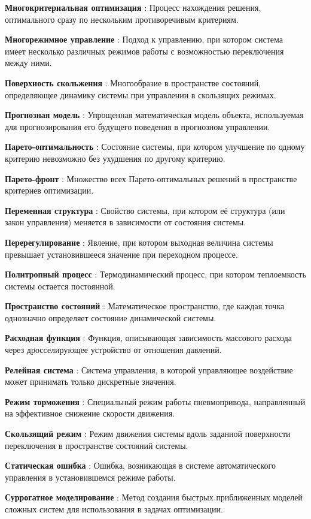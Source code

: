 \textbf{Многокритериальная оптимизация} : Процесс нахождения решения, оптимального сразу по нескольким противоречивым критериям.

\textbf{Многорежимное управление} : Подход к управлению, при котором система имеет несколько различных режимов работы с возможностью переключения между ними.

\textbf{Поверхность скольжения} : Многообразие в пространстве состояний, определяющее динамику системы при управлении в скользящих режимах.

\textbf{Прогнозная модель} : Упрощенная математическая модель объекта, используемая для прогнозирования его будущего поведения в прогнозном управлении.

\textbf{Парето-оптимальность} : Состояние системы, при котором улучшение по одному критерию невозможно без ухудшения по другому критерию.

\textbf{Парето-фронт} : Множество всех Парето-оптимальных решений в пространстве критериев оптимизации.

\textbf{Переменная структура} : Свойство системы, при котором её структура (или закон управления) меняется в зависимости от состояния системы.

\textbf{Перерегулирование} : Явление, при котором выходная величина системы превышает установившееся значение при переходном процессе.

\textbf{Политропный процесс} : Термодинамический процесс, при котором теплоемкость системы остается постоянной.

\textbf{Пространство состояний} : Математическое пространство, где каждая точка однозначно определяет состояние динамической системы.

\textbf{Расходная функция} : Функция, описывающая зависимость массового расхода через дросселирующее устройство от отношения давлений.

\textbf{Релейная система} : Система управления, в которой управляющее воздействие может принимать только дискретные значения.

\textbf{Режим торможения} : Специальный режим работы пневмопривода, направленный на эффективное снижение скорости движения.

\textbf{Скользящий режим} : Режим движения системы вдоль заданной поверхности переключения в пространстве состояний системы.

\textbf{Статическая ошибка} : Ошибка, возникающая в системе автоматического управления в установившемся режиме работы.

\textbf{Суррогатное моделирование} : Метод создания быстрых приближенных моделей сложных систем для использования в задачах оптимизации.


